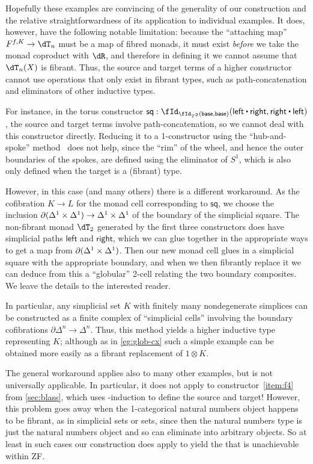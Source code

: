 \begin{enumerate}
\begin{enumerate}
Hopefully these examples are convincing of the generality of our construction and the relative straightforwardness of its application to individual examples.
It does, however, have the following notable limitation: because the ``attaching map'' $F^{f,K}\to \dT_n$ must be a map of fibred monads, it must exist \emph{before} we take the monad coproduct with $\dR$, and therefore in defining it we cannot assume that $\dT_n(X)$ is fibrant.
Thus, the source and target terms of a higher constructor cannot use operations that only exist in fibrant types, such as path-concatenation and eliminators of other inductive types.

For instance, in the torus constructor $\mathsf{sq} : \id[{\id[T^2]{\mathsf{base}}{\mathsf{base}}}]{\mathsf{left}\ct\mathsf{right}}{\mathsf{right}\ct\mathsf{left}}$, the source and target terms involve path-concatenation, so we cannot deal with this constructor directly.
Reducing it to a 1-constructor using the ``hub-and-spoke'' method~\cite[]{hottbook} does not help, since the ``rim'' of the wheel, and hence the outer boundaries of the spokes, are defined using the eliminator of $S^1$, which is also only defined when the target is a (fibrant) type.

However, in this case (and many others) there is a different workaround.
As the cofibration $K\to L$ for the monad cell corresponding to $\mathsf{sq}$, we choose the inclusion $\partial({\Delta^1}\times{\Delta^1}) \to {\Delta^1}\times{\Delta^1}$ of the boundary of the simplicial square.
The non-fibrant monad $\dT_2$ generated by the first three constructors does have simplicial paths $\mathsf{left}$ and $\mathsf{right}$, which we can glue together in the appropriate ways to get a map from $\partial({\Delta^1}\times{\Delta^1})$.
Then our new monad cell glues in a simplicial square with the appropriate boundary, and when we then fibrantly replace it we can deduce from this a ``globular'' 2-cell relating the two boundary composites.
We leave the details to the interested reader.

In particular, any simplicial set $K$ with finitely many nondegenerate simplices can be constructed as a finite complex of ``simplicial cells'' involving the boundary cofibrations $\partial\Delta^n \to \Delta^n$.
Thus, this method yields a higher inductive type representing $K$; although as in \cref{eg:glob-cx} such a simple example can be obtained more easily as a fibrant replacement of $1\otimes K$.

The general workaround applies also to many other examples, but is not universally applicable.
In particular, it does not apply to constructor~\ref{item:f4} from \cref{sec:blass}, which uses \N-induction to define the source and target!
However, this problem goes away when the 1-categorical natural numbers object happens to be fibrant, as in simplicial sets or sets, since then the natural numbers type is just the natural numbers object and so can eliminate into arbitrary objects.
So at least in such cases our construction does apply to yield the \iF that is unachievable within ZF.


\end{enumerate}
\end{enumerate}
